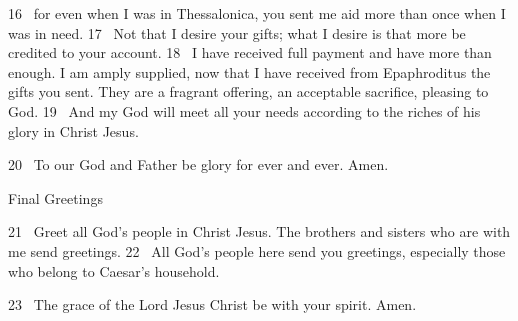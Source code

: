 16 
for even when I was in Thessalonica,
you sent me aid more than once when I was in need.
17 
Not that I desire your gifts; what I desire is that more be credited to your account.
18 
I have received full payment and have more than enough. I am amply supplied, now that I have received from Epaphroditus
the gifts you sent. They are a fragrant
offering, an acceptable sacrifice, pleasing to God.
19 
And my God will meet all your needs
according to the riches of his glory
in Christ Jesus.
\par
20 
To our God and Father
be glory for ever and ever. Amen.
\par
Final Greetings
\par
21 
Greet all God’s people in Christ Jesus. The brothers and sisters who are with me
send greetings.
22 
All God’s people
here send you greetings, especially those who belong to Caesar’s household.
\par
23 
The grace of the Lord Jesus Christ
be with your spirit.
Amen.



\bye

